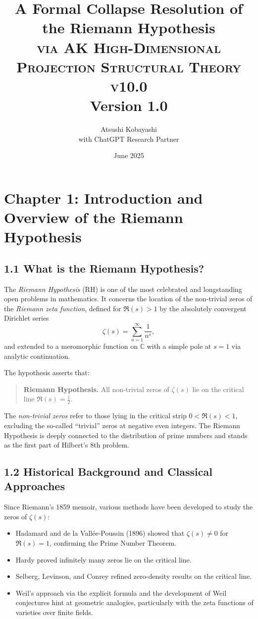 \documentclass[11pt]{article}
\title{A Formal Collapse Resolution of the Riemann Hypothesis \\ 
\Large \textsc{via AK High-Dimensional Projection Structural Theory v10.0} \\
\small Version 1.0}
\author{Atsushi Kobayashi \\ \small with ChatGPT Research Partner}
\date{June 2025}
\begin{document}
\maketitle
\tableofcontents
\newpage



\section{Chapter 1: Introduction and Overview of the Riemann Hypothesis}
\subsection{1.1 What is the Riemann Hypothesis?}

The \emph{Riemann Hypothesis} (RH) is one of the most celebrated and longstanding open problems in mathematics.  
It concerns the location of the non-trivial zeros of the \emph{Riemann zeta function}, defined for $\Re(s) > 1$ by the absolutely convergent Dirichlet series
\[
\zeta(s) = \sum_{n=1}^\infty \frac{1}{n^s},
\]
and extended to a meromorphic function on $\mathbb{C}$ with a simple pole at $s = 1$ via analytic continuation.

The hypothesis asserts that:

\begin{quote}
\textbf{Riemann Hypothesis.} All non-trivial zeros of $\zeta(s)$ lie on the critical line $\Re(s) = \tfrac{1}{2}$.
\end{quote}

The \emph{non-trivial zeros} refer to those lying in the critical strip $0 < \Re(s) < 1$, excluding the so-called ``trivial'' zeros at negative even integers.  
The Riemann Hypothesis is deeply connected to the distribution of prime numbers and stands as the first part of Hilbert's 8th problem.

\subsection{1.2 Historical Background and Classical Approaches}

Since Riemann’s 1859 memoir, various methods have been developed to study the zeros of $\zeta(s)$:

\begin{itemize}
    \item Hadamard and de la Vallée-Poussin (1896) showed that $\zeta(s) \ne 0$ for $\Re(s) = 1$, confirming the Prime Number Theorem.
    \item Hardy proved infinitely many zeros lie on the critical line.
    \item Selberg, Levinson, and Conrey refined zero-density results on the critical line.
    \item Weil's approach via the explicit formula and the development of Weil conjectures hint at geometric analogies, particularly with the zeta functions of varieties over finite fields.
\end{itemize}
\end{document}
